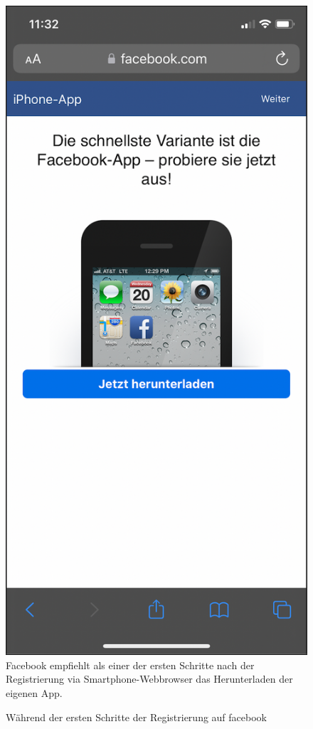 \documentclass[a4paper]{scrartcl}
\begin{document}
\begin{figure}[H]
	\centering
	\caption{Während der ersten Schritte der Registrierung auf facebook}
	\includegraphics[scale=0.3]{_assets/facebook_native_app2.png} \\
	Facebook empfiehlt als einer der ersten Schritte nach der Registrierung via Smartphone-Webbrowser das Herunterladen der eigenen App.
\end{figure}
\end{document}
